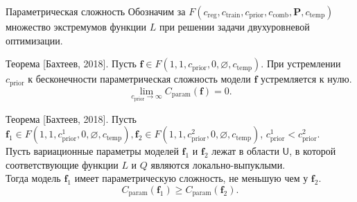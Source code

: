 \documentclass[usenames,dvipsnames,11pt,pdf,utf8,russian,aspectratio=169]{beamer}
\begin{document}
\begin{frame}{Параметрическая сложность}
\small
Обозначим за $F(c_{\text{reg}}, c_{\text{train}}, c_{\text{prior}}, c_{\text{comb}}, \mathbf{P}, c_{\text{temp}})$ множество экстремумов функции $L$ при решении задачи двухуровневой оптимизации.
\begin{block}{Теорема [Бахтеев, 2018].}
Пусть $\mathbf{f} \in F(1, 1, c_{\text{prior}}, 0, \varnothing,  c_{\text{temp}} )$.
При устремлении $ c_{\text{prior}}$ к бесконечности параметрическая сложность модели $\mathbf{f}$ устремляется к нулю.
\[
    \lim_{c_{\text{prior}} \to \infty} C_{\text{param}}(\mathbf{f}) = 0.
\]
\end{block}

\begin{block}{Теорема [Бахтеев, 2018].}
Пусть $\mathbf{f}_1 \in F(1, 1, c_{\text{prior}}^1, 0, \varnothing,  c_{\text{temp}} ), \mathbf{f}_2 \in F(1, 1, c_{\text{prior}}^2, 0, \varnothing,  c_{\text{temp}})$, $c_{\text{prior}}^1 < c_{\text{prior}}^2$.\\
Пусть вариационные параметры моделей $\mathbf{f}_1$ и $\mathbf{f}_2$ лежат в области $\mathsf{U}$, в которой соответствующие функции $L$ и $Q$ являются локально-выпуклыми.\\ 
Тогда модель $\mathbf{f}_1$ имеет параметрическую сложность, не меньшую чем у $\mathbf{f}_2$.
\[
    C_\text{param}(\mathbf{f}_1) \geq C_\text{param}(\mathbf{f}_2).
\]
\end{block}


\end{frame}
\end{document}
